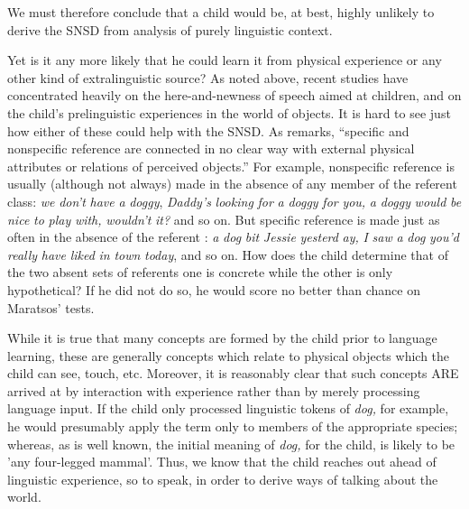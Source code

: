 We must therefore conclude that a child would be, at best, highly unlikely to derive the SNSD from analysis of purely linguistic context.

Yet is it any more likely that he could learn it from physical
experience or any other kind of extralinguistic source? As noted above, recent studies have concentrated heavily on the here-and-newness of speech aimed at children, and on the child's prelinguistic experiences in the world of objects. It is hard to see just how either of these could help with the SNSD. As \citet[94]{Maratsos1976} remarks, ``specific and nonspecific reference are connected in no clear way with external physical attributes or relations of perceived objects.'' For example, nonspecific reference is usually (although not always) made in the absence of any member of the referent class: \textit{we} \textit{don't} \textit{have} \textit{a} \textit{dogg}\textit{y}, \textit{Dad}\textit{d}\textit{y's} \textit{looki}\textit{n}\textit{g} \textit{for} \textit{a} \textit{doggy} \textit{for} \textit{you,} \textit{a} \textit{doggy} \textit{would} \textit{be} \textit{nice} \textit{to} \textit{play} \textit{with,} \textit{wouldn't} \textit{it?} and so on. But specific reference is made just as often in the absence of the referent : \textit{a} \textit{dog} \textit{bit} \textit{Jessie} \textit{yesterd} \textit{ay,} \textit{I} \textit{saw} \textit{a} \textit{dog} \textit{you'd} \textit{really} \textit{have} \textit{liked} \textit{in} \textit{town} \textit{toda}\textit{y}, and so on. How does the child determine that of the two absent sets of referents one is concrete while the other is only hypothetical? If he did not do so, he would score no better than chance on Maratsos' tests.


While it is true that many concepts are formed by the child prior to language learning, these are generally concepts which relate to physical objects which the child can see, touch, etc. Moreover, it is reasonably clear that such concepts ARE arrived at by interaction with experience rather than by merely processing language input. If the child only processed linguistic tokens of \textit{dog,} for example, he would pre\-sumably apply the term only to members of the appropriate species; whereas, as is well known, the initial meaning of \textit{dog,} for the child, is likely to be 'any four-legged mammal'. Thus, we know that the child reaches out ahead of linguistic experience, so to speak, in order
to derive ways of talking about the world.


